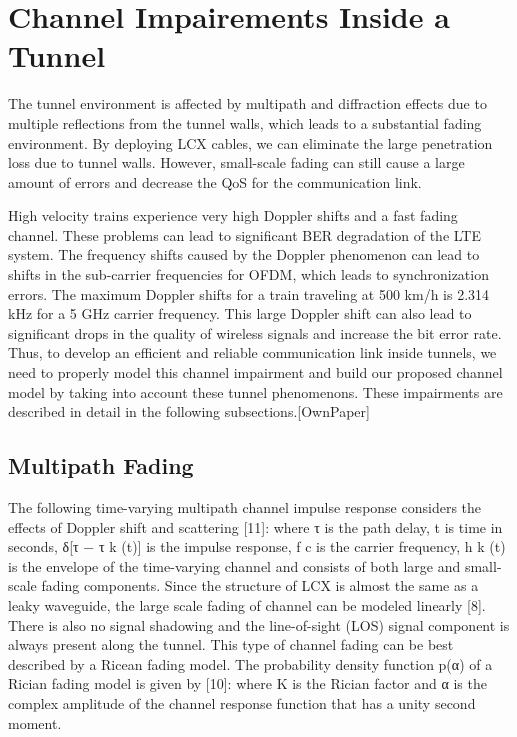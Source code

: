 \section{Channel Impairements Inside a Tunnel}
The tunnel environment is affected by multipath and diffraction effects due to multiple reflections from the tunnel walls,
which leads to a substantial fading environment. By deploying LCX cables, we can eliminate the large penetration loss
due to tunnel walls. However, small-scale fading can still cause a large amount of errors and decrease the QoS for the communication link.

High velocity trains experience very high Doppler shifts and a fast fading channel. These problems can lead to significant
BER degradation of the LTE system. The frequency shifts caused by the Doppler phenomenon can lead to shifts in the
sub-carrier frequencies for OFDM, which leads to synchronization errors. The maximum Doppler shifts for a train traveling at 500 km/h is 2.314 kHz for a 5 GHz carrier frequency.
This large Doppler shift can also lead to significant drops in the quality of wireless signals and increase the bit error rate. Thus,
to develop an efficient and reliable communication link inside tunnels, we need to properly model this channel impairment
and build our proposed channel model by taking into account these tunnel phenomenons. These impairments are described in detail in the following subsections.[OwnPaper]

\subsection{Multipath Fading}
The following time-varying multipath channel impulse response considers the effects of Doppler shift and scattering [11]: where τ is the path delay, t is time in seconds, δ[τ − τ k (t)]
is the impulse response, f c is the carrier frequency, h k (t) is the envelope of the time-varying channel and consists of both
large and small-scale fading components. Since the structure of LCX is almost the same as a leaky waveguide, the large
scale fading of channel can be modeled linearly [8]. There is also no signal shadowing and the line-of-sight (LOS) signal
component is always present along the tunnel. This type of channel fading can be best described by a Ricean fading
model. The probability density function p(α) of a Rician fading model is given by [10]: where K is the Rician factor and α is the complex amplitude of
the channel response function that has a unity second moment. 

